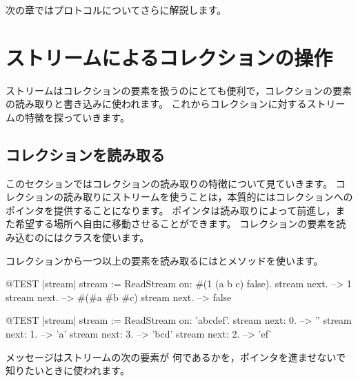 \documentclass[a4paper,10pt,twoside]{book}
\begin{document}
次の章ではプロトコルについてさらに解説します。

\section{ストリームによるコレクションの操作}

ストリームはコレクションの要素を扱うのにとても便利で，コレクションの要素の読み取りと書き込みに使われます。
これからコレクションに対するストリームの特徴を探っていきます。


\subsection{コレクションを読み取る}

このセクションではコレクションの読み取りの特徴について見ていきます。
コレクションの読み取りにストリームを使うことは，本質的にはコレクションへのポインタを提供することになります。
ポインタは読み取りによって前進し，また希望する場所へ自由に移動させることができます。
コレクションの要素を読み込むのにはクラスを使います。

コレクションから一つ以上の要素を読み取るにはとメソッドを使います。

\begin{code}{@TEST |stream|}
stream := ReadStream on: #(1 (a b c) false).
stream next. -->   1
stream next. -->   #(#a #b #c)
stream next. -->   false
\end{code}

\begin{code}{@TEST |stream|}
stream := ReadStream on: 'abcdef'.
stream next: 0. -->   ''
stream next: 1. -->   'a'
stream next: 3. -->   'bcd'
stream next: 2. -->   'ef'
\end{code}

メッセージはストリームの次の要素が
何であるかを，ポインタを進ませないで知りたいときに使われます。

\noindent
\end{document}
